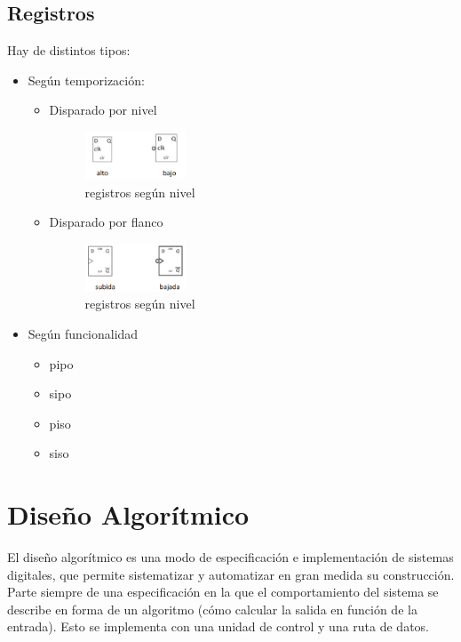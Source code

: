 \subsection{Registros}
Hay de distintos tipos:
\begin{itemize}
	\item Según temporización:
	      \begin{itemize}
		      \item Disparado por nivel
		            \begin{figure}[H]
			            \centering
			            \includegraphics[width= 0.3\textwidth]{images/Tema_4/registros_nivel.PNG}
			            \caption{registros según nivel}
		            \end{figure}
		      \item Disparado por flanco
		            \begin{figure}[H]
			            \centering
			            \includegraphics[width= 0.3\textwidth]{images/Tema_4/registros_flanco.PNG}
			            \caption{registros según nivel}
		            \end{figure}
	      \end{itemize}
	\item Según funcionalidad
	      \begin{itemize}
		      \item \gls{pipo}
		      \item \gls{sipo}
		      \item \gls{piso}
		      \item \gls{siso}
	      \end{itemize}
\end{itemize}

\section{Diseño Algorítmico}

El diseño algorítmico es una modo de especificación e implementación de sistemas digitales, que permite sistematizar y automatizar en gran medida su construcción. Parte siempre de una especificación en la que el comportamiento del sistema se describe en forma de un algoritmo (cómo calcular la salida en función de la entrada). Esto se implementa con una unidad de control y una ruta de datos.

